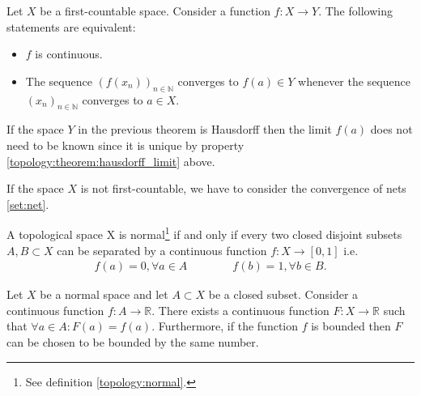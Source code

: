 
    \begin{property}[Continuity]
        Let $X$ be a first-countable space. Consider a function $f:X\rightarrow Y$. The following statements are equivalent:
        \begin{itemize}
            \item $f$ is continuous.
            \item The sequence $(f(x_n))_{n\in\mathbb{N}}$ converges to $f(a)\in Y$ whenever the sequence $(x_n)_{n\in\mathbb{N}}$ converges to $a\in X$.
        \end{itemize}
    \end{property}
    \begin{result}
       If the space $Y$ in the previous theorem is Hausdorff then the limit $f(a)$ does not need to be known since it is unique by property \ref{topology:theorem:hausdorff_limit} above.
    \end{result}
    \begin{remark}
        If the space $X$ is not first-countable, we have to consider the convergence of nets \ref{set:net}.
    \end{remark}

    \begin{theorem}\label{topology:urysohns_lemma}
        A topological space X is normal\footnote{See definition \ref{topology:normal}.} if and only if every two closed disjoint subsets $A, B\subset X$ can be separated by a continuous function $f:X\rightarrow [0, 1]$ i.e.
        \begin{gather}
            f(a) = 0, \forall a\in A\qquad\qquad f(b) = 1, \forall b\in B.
        \end{gather}
    \end{theorem}

    \begin{theorem}
        Let $X$ be a normal space and let $A\subset X$ be a closed subset. Consider a continuous function $f:A\rightarrow\mathbb{R}$. There exists a continuous function $F:X\rightarrow\mathbb{R}$ such that $\forall a\in A: F(a) = f(a)$. Furthermore, if the function $f$ is bounded then $F$ can be chosen to be bounded by the same number.
    \end{theorem}

